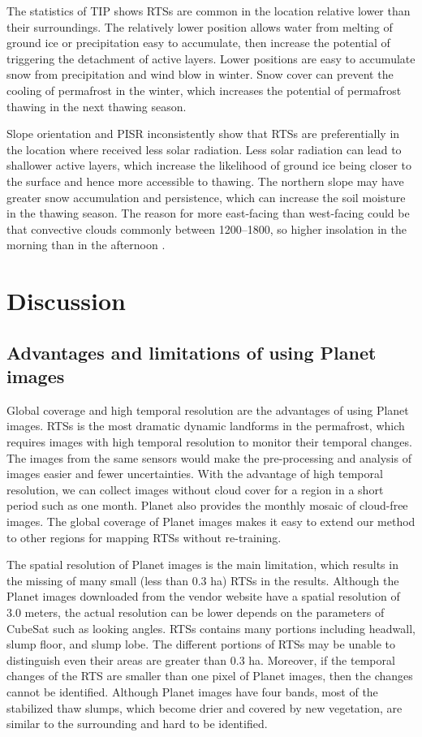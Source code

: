 \documentclass[preprint,12pt,authoryear]{elsarticle}
\begin{document}
The statistics of TIP shows RTSs are common in the location relative lower than their surroundings. The relatively lower position allows water from melting of ground ice or precipitation easy to accumulate, then increase the potential of triggering the detachment of active layers. Lower positions are easy to accumulate snow from precipitation and wind blow in winter. Snow cover can prevent the cooling of permafrost in the winter, which increases the potential of permafrost thawing in the next thawing season. 

Slope orientation and PISR inconsistently show that RTSs are preferentially in the location where received less solar radiation. Less solar radiation can lead to shallower active layers, which increase the likelihood of ground ice being closer to the surface and hence more accessible to thawing. The northern slope may have greater snow accumulation and persistence, which can increase the soil moisture in the thawing season. The reason for more east-facing than west-facing could be that convective clouds commonly between 1200--1800, so higher insolation in the morning than in the afternoon \citep{niu2014thaw}.


\section{Discussion}
\label{sec_discussion}

\subsection{Advantages and limitations of using Planet images}
\label{subsec_advantage_limitation_planet}

Global coverage and high temporal resolution are the advantages of using Planet images. RTSs is the most dramatic dynamic landforms in the permafrost, which requires images with high temporal resolution to monitor their temporal changes. The images from the same sensors would make the pre-processing and analysis of images easier and fewer uncertainties. With the advantage of high temporal resolution, we can collect images without cloud cover for a region in a short period such as one month. Planet also provides the monthly mosaic of cloud-free images. The global coverage of Planet images makes it easy to extend our method to other regions for mapping RTSs without re-training. 

The spatial resolution of Planet images is the main limitation, which results in the missing of many small (less than 0.3 ha) RTSs in the results. Although the Planet images downloaded from the vendor website have a spatial resolution of 3.0 meters, the actual resolution can be lower depends on the parameters of CubeSat such as looking angles. RTSs contains many portions including headwall, slump floor, and slump lobe. The different portions of RTSs may be unable to distinguish even their areas are greater than 0.3 ha. Moreover, if the temporal changes of the RTS are smaller than one pixel of Planet images, then the changes cannot be identified. Although Planet images have four bands, most of the stabilized thaw slumps, which become drier and covered by new vegetation, are similar to the surrounding and hard to be identified.
\end{document}
